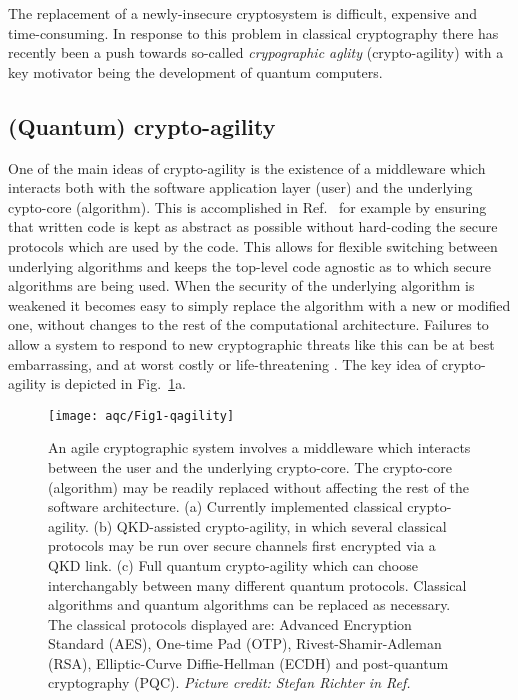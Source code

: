 The replacement of a newly-insecure cryptosystem is difficult, expensive and time-consuming. In response to this problem in classical cryptography there has recently been a push towards so-called \emph{crypographic aglity} (crypto-agility) \cite{Sullivan2009, Chen2016} with a key motivator being the development of quantum computers. %

\subsection{(Quantum) crypto-agility}

One of the main ideas of crypto-agility is the existence of a middleware which interacts both with the software application layer (user) and the underlying cypto-core (algorithm). This is accomplished in Ref.~\cite{Sullivan2009} for example by ensuring that written code is kept as abstract as possible without hard-coding the secure protocols which are used by the code. This allows for flexible switching between underlying algorithms and keeps the top-level code agnostic as to which secure algorithms are being used. When the security of the underlying algorithm is weakened it becomes easy to simply replace the algorithm with a new or modified one, without changes to the rest of the computational architecture. Failures to allow a system to respond to new cryptographic threats like this can be at best embarrassing, and at worst costly or life-threatening \cite{Schneier2016, Schneier2017}. The key idea of crypto-agility is depicted in Fig.~\ref{fig:agility}a. 


\begin{figure}[htp]
\centering
\texttt{[image: aqc/Fig1-qagility]}
\caption{\label{fig:agility} An agile cryptographic system involves a middleware which interacts between the user and the underlying crypto-core. The crypto-core (algorithm) may be readily replaced without affecting the rest of the software architecture. (a) Currently implemented classical crypto-agility. (b) QKD-assisted crypto-agility, in which several classical protocols may be run over secure channels first encrypted via a QKD link. (c) Full quantum crypto-agility which can choose interchangably between many different quantum protocols. Classical algorithms and quantum algorithms can be replaced as necessary. The classical protocols displayed are: Advanced Encryption Standard (AES), One-time Pad (OTP), Rivest-Shamir-Adleman (RSA), Elliptic-Curve Diffie-Hellman (ECDH) and post-quantum cryptography (PQC). \emph{Picture credit: Stefan Richter in Ref.~\cite{Richter2020}}}
\end{figure}


